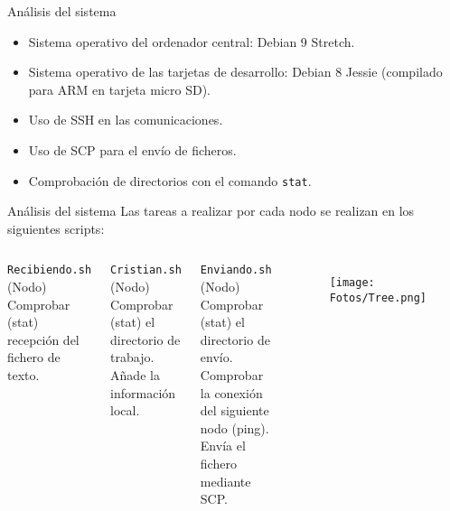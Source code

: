 \documentclass[aspectratio=169]{beamer}
\begin{document}
\begin{frame}{Análisis del sistema}
	\begin{itemize}
		\item Sistema operativo del ordenador central: Debian 9 Stretch.
		\item Sistema operativo de las tarjetas de desarrollo: Debian 8 Jessie (compilado para ARM en tarjeta micro SD).
		\item Uso de SSH en las comunicaciones.
		\item Uso de SCP para el envío de ficheros.
		\item Comprobación de directorios con el comando \texttt{stat}.
	\end{itemize}
\end{frame}

\begin{frame}{Análisis del sistema}
	Las tareas a realizar por cada nodo se realizan en los siguientes scripts:
	

\begin{columns}
		\begin{block}{\texttt{Recibiendo.sh} (Nodo)}
			Comprobar (stat) recepción del fichero de texto.
		\end{block}
		\begin{block}{\texttt{Cristian.sh} (Nodo)}
			Comprobar (stat) el directorio de trabajo.
			Añade la información local.
		\end{block}
		\begin{block}{\texttt{Enviando.sh} (Nodo)}
			Comprobar (stat) el directorio de envío.
			Comprobar la conexión del siguiente nodo (ping).
			Envía el fichero mediante SCP.
		\end{block}
		\begin{figure}[h]
			\centering
			\texttt{[image: Fotos/Tree.png]}
		\end{figure}
\end{columns}
\end{frame}
\end{document}
